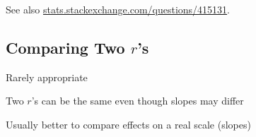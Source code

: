 See also \href{https://stats.stackexchange.com/questions/415131}{stats.stackexchange.com/questions/415131}.

\subsection{Comparing Two $r$'s}
\bi
\item Rarely appropriate
\item Two $r$'s can be the same even though slopes may differ
\item Usually better to compare effects on a real scale (slopes)
\ei
